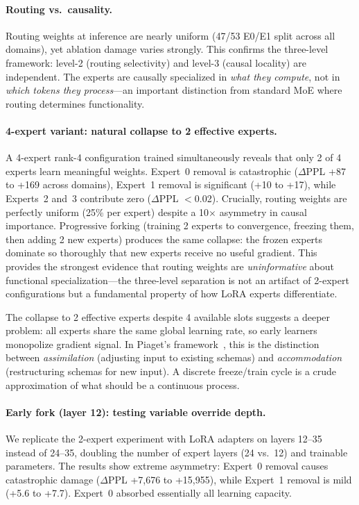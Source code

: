 \documentclass{article}
\begin{document}
\paragraph{Routing vs.\ causality.}
Routing weights at inference are nearly uniform (47/53 E0/E1 split across all
domains), yet ablation damage varies strongly. This confirms the three-level
framework: level-2 (routing selectivity) and level-3 (causal locality) are
independent. The experts are causally specialized in \emph{what they compute},
not in \emph{which tokens they process}---an important distinction from
standard MoE where routing determines functionality.

\paragraph{4-expert variant: natural collapse to 2 effective experts.}
A 4-expert rank-4 configuration trained simultaneously reveals that only 2 of 4
experts learn meaningful weights. Expert~0 removal is catastrophic
($\Delta$PPL +87 to +169 across domains), Expert~1 removal is significant
(+10 to +17), while Experts~2 and~3 contribute zero ($\Delta$PPL $<$0.02).
Crucially, routing weights are perfectly uniform (25\% per expert) despite
a 10$\times$ asymmetry in causal importance. Progressive forking (training 2
experts to convergence, freezing them, then adding 2 new experts) produces
the same collapse: the frozen experts dominate so thoroughly that new experts
receive no useful gradient. This provides the strongest evidence that routing
weights are \emph{uninformative} about functional specialization---the
three-level separation is not an artifact of 2-expert configurations but a
fundamental property of how LoRA experts differentiate.

The collapse to 2 effective experts despite 4 available slots suggests a
deeper problem: all experts share the same global learning rate, so early
learners monopolize gradient signal. In Piaget's
framework~\cite{piaget1952}, this is the distinction between
\emph{assimilation} (adjusting input to existing schemas) and
\emph{accommodation} (restructuring schemas for new input). A discrete
freeze/train cycle is a crude approximation of what should be a continuous
process.

\paragraph{Early fork (layer 12): testing variable override depth.}
We replicate the 2-expert experiment with LoRA adapters on layers 12--35
instead of 24--35, doubling the number of expert layers (24 vs.\ 12) and
trainable parameters. The results show extreme asymmetry: Expert~0 removal
causes catastrophic damage ($\Delta$PPL +7,676 to +15,955), while Expert~1
removal is mild (+5.6 to +7.7). Expert~0 absorbed essentially all learning
capacity.
\end{document}
